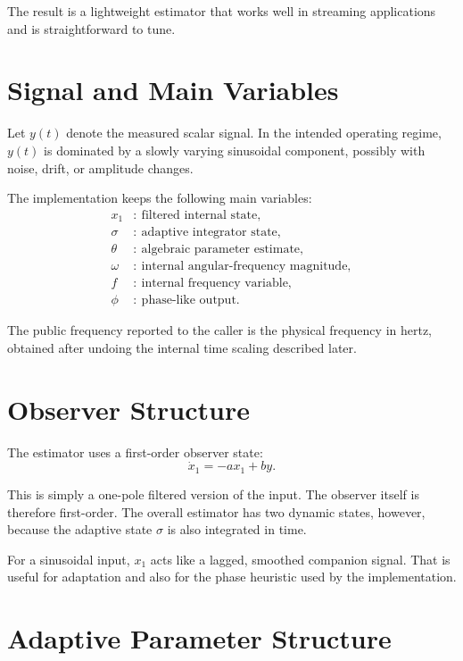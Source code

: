 \documentclass[conference]{IEEEtran}
\begin{document}
    The result is a lightweight estimator that works well in streaming
    applications and is straightforward to tune.

    \section{Signal and Main Variables}

    Let $y(t)$ denote the measured scalar signal. In the intended operating
    regime, $y(t)$ is dominated by a slowly varying sinusoidal component,
    possibly with noise, drift, or amplitude changes.

    The implementation keeps the following main variables:
    \begin{align}
        x_1 &:\ \text{filtered internal state},\\
        \sigma &:\ \text{adaptive integrator state},\\
        \theta &:\ \text{algebraic parameter estimate},\\
        \omega &:\ \text{internal angular-frequency magnitude},\\
        f &:\ \text{internal frequency variable},\\
        \phi &:\ \text{phase-like output}.
    \end{align}

    The public frequency reported to the caller is the physical frequency in hertz,
    obtained after undoing the internal time scaling described later.

    \section{Observer Structure}

    The estimator uses a first-order observer state:
    \begin{equation}
        \dot{x}_1 = -a x_1 + b y.
    \end{equation}

    This is simply a one-pole filtered version of the input. The observer itself
    is therefore first-order. The overall estimator has two dynamic states,
    however, because the adaptive state $\sigma$ is also integrated in time.

    For a sinusoidal input, $x_1$ acts like a lagged, smoothed companion signal.
    That is useful for adaptation and also for the phase heuristic used by the
    implementation.

    \section{Adaptive Parameter Structure}
\end{document}
